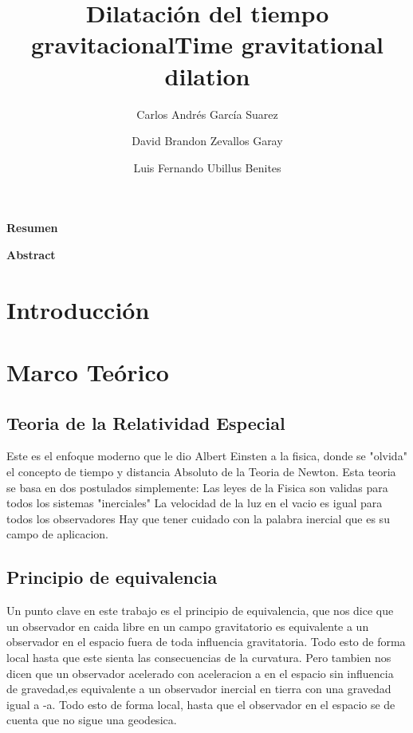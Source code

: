 \documentclass[12pt,twoside]{rif}
\title{\textbf{Dilatación del tiempo gravitacional}}
\author[1]{{\small Carlos Andrés García Suarez}}
\author[1]{{\small David Brandon Zevallos Garay}}
\author[1]{{\small Luis Fernando Ubillus Benites}}
\affil[1]{{ \small Facultad de Ciencias Naturales y Matemática, Universidad
		Nacional Federico Villarreal. El Agustino 15003. Lima-Perú.}}
\date{}
\begin{document}
	\maketitle
	
	\begin{res}
		\begin{center}
			\textbf{Resumen} \\
		\end{center}
		\lipsum[2]
		
		\par
		\smallskip
	\end{res}
	\begin{center}
		\title{\textbf{Time gravitational dilation}}
	\end{center}
	
	\begin{abst}
		\begin{center}
			\textbf{Abstract} \\
		\end{center}
		\lipsum[2]
		
		\par 
		\smallskip
	\end{abst}

	
	
	\newpage
	
	\tableofcontents
	
	\section{ Introducción} 
	
	\section{Marco Teórico}
	\subsection{Teoria de la Relatividad Especial}
	Este es el enfoque moderno que le dio Albert Einsten a la fisica, donde se "olvida" el concepto de tiempo y distancia Absoluto de la Teoria de Newton.
	Esta teoria se basa en dos postulados simplemente:
	Las leyes de la Fisica son validas para todos los sistemas "inerciales"
	 La velocidad de la luz en el vacio es igual para todos los observadores 
	Hay que tener cuidado con la palabra inercial que es su campo de aplicacion.
	\subsection{Principio de equivalencia}
	Un punto clave en este trabajo es el principio de equivalencia, que nos dice que un observador en caida libre en un campo gravitatorio es equivalente a un observador en el espacio fuera de toda influencia gravitatoria. Todo esto de forma local hasta que este sienta las consecuencias de la curvatura. Pero tambien nos dicen que un observador acelerado con aceleracion a en el espacio sin influencia de gravedad,es equivalente a un observador inercial en tierra con una gravedad igual a -a. Todo esto de forma local, hasta que el observador en el espacio se de cuenta que no sigue una geodesica.
\end{document}
